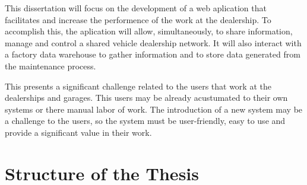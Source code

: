 This dissertation will focus on the development of a web aplication that facilitates and increase the performence of the work at the dealership.
To accomplish this, the aplication will allow, simultaneously, to share information, manage and control a shared vehicle dealership network.
It will also interact with a factory data warehouse to gather information and to store data generated from the maintenance process. 

This presents a significant challenge related to the users that work at the dealerships and garages. 
This users may be already acustumated to their own systems or there manual labor of work.  
The introduction of a new system may be a challenge to the users, so the system must be user-friendly, easy to use and provide a significant value in their work.

\section{Structure of the Thesis}

